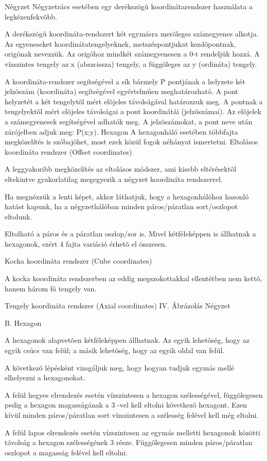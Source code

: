 
Négyzet
Négyzetrács esetében egy derékszögû koordinátarendszer használata a legkézenfekvõbb. 

A derékszögû koordináta-rendszert két egymásra merõleges számegyenes alkotja. Az egyeneseket koordinátatengelyeknek, metszéspontjukat kezdõpontnak, origónak nevezzük. Az origóhoz mindkét számegyenesen a 0-t rendeljük hozzá. A vízszintes tengely az x (abszcissza) tengely, a függõleges az y (ordináta) tengely.

A koordináta-rendszer segítségével a sík bármely P pontjának a helyzete két jelzõszám (koordináta) segítségével egyértelmûen meghatározható. A pont helyzetét a két tengelytõl mért elõjeles távolságával határozzuk meg. A pontnak a tengelyektõl mért elõjeles távolságai a pont koordinátái (jelzõszámai). Az elõjelek a számegyenesek segítségével adhatók meg. A jelzõszámokat, a pont neve után zárójelben adjuk meg: P(x;y).
Hexagon
A hexagonháló esetében többfajta megközelítés is szóbajöhet, most ezek közül fogok néhányat ismertetni. 
Eltolásos koordináta rendszer (Offset coordinates)

	A leggyakoribb megközelítés az eltolásos módszer, ami kisebb eltérésektõl eltekintve gyakorlatilag megegyezik a négyzet koordináta rendszerrel. 

Ha megnézzük a lenti képet, akkor láthatjuk, hogy a hexagonhálóhoz hasonló hatást kapunk, ha a négyzethálóban minden páros/páratlan sort/oszlopot eltolunk.

Eltolható a páros és a páratlan oszlop/sor is. Mivel kétféleképpen is állhatnak a hexagonok, ezért 4 fajta variáció érhetõ el összesen.
		
Kocka koordináta rendszer (Cube coordinates)

	A kocka koordináta rendszerben az eddig megszokottakkal ellentétben nem kettõ, hanem három fõ tengely van.

Tengely koordináta rendszer (Axial coordinates)
IV. Ábrázolás
Négyzet

B. Hexagon

A hexagonok alapvetõen kétféleképpen állhatnak. 
Az egyik lehetõség, hogy az egyik csúcs van felül;
a másik lehetõség, hogy az egyik oldal van felül. 

A következõ lépésként vizsgáljuk meg, hogy hogyan tudjuk egymás mellé elhelyezni a hexagonokat.

A felül hegyes elrendezés esetén vízszintesen a hexagon szélességével, függõlegesen pedig a hexagon magasságának a 3 -vel kell eltolni következõ hexagont. Ezen kívül minden páros/páratlan sort vízszintesen a szélesség felével kell még eltolni.

A felül lapos elrendezés esetén vízszintesen az egymás melletti hexagonok közötti távolság a hexagon szélességének 3 része. Függõlegesen minden páros/páratlan oszlopot a magasság felével kell eltolni.
